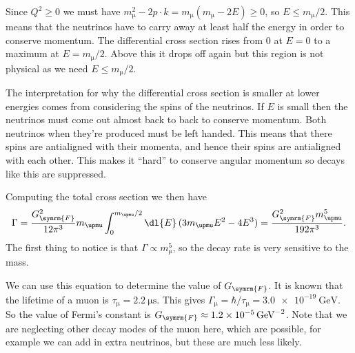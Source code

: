 \documentclass[fleqn]{NotesClass}
\newcommand{\Pmux}{\ensuremath{\upmu}}
\newcommand{\fermiConst}{G_{\symrm{F}}}
\begin{document}
    Since \(Q^2 \ge 0\) we must have \(m_{\Pmux}^2 - 2p \cdot k = m_{\Pmux}(m_{\Pmux} - 2E) \ge 0\), so \(E \le m_{\Pmux}/2\).
    This means that the neutrinos have to carry away at least half the energy in order to conserve momentum.
    The differential cross section rises from \(0\) at \(E = 0\) to a maximum at \(E = m_{\Pmux}/2\).
    Above this it drops off again but this region is not physical as we need \(E \le m_{\Pmux}/2\).
    
    The interpretation for why the differential cross section is smaller at lower energies comes from considering the spins of the neutrinos.
    If \(E\) is small then the neutrinos must come out almost back to back to conserve momentum.
    Both neutrinos when they're produced must be left handed.
    This means that there spins are antialigned with their momenta, and hence their spins are antialigned with each other.
    This makes it \enquote{hard} to conserve angular momentum so decays like this are suppressed.
    
    Computing the total cross section we then have
    \begin{equation}
        \Gamma = \frac{\fermiConst^2}{12\pi^3}m_{\Pmux} \int_0^{m_{\Pmux}/2} \dl{E} \, (3m_{\Pmux} E^2 - 4E^3) = \frac{\fermiConst^2 m_{\Pmux}^5}{192\pi^3}.
    \end{equation}
    The first thing to notice is that \(\Gamma \propto m_{\Pmux}^5\), so the decay rate is very sensitive to the mass.
    
    We can use this equation to determine the value of \(\fermiConst\).
    It is known that the lifetime of a muon is \(\tau_{\Pmux} = \qty{2.2}{\micro\second}\).
    This gives \(\Gamma_{\Pmux} = \hbar/\tau_{\Pmux} = \qty{3.0e-19}{\giga\electronvolt}\).
    So the value of Fermi's constant is \(\fermiConst \approx \qty{1.2e-5}{\per\giga\electronvolt\squared}\).
    Note that we are neglecting other decay modes of the muon here, which are possible, for example we can add in extra neutrinos, but these are much less likely.
    
\end{document}

